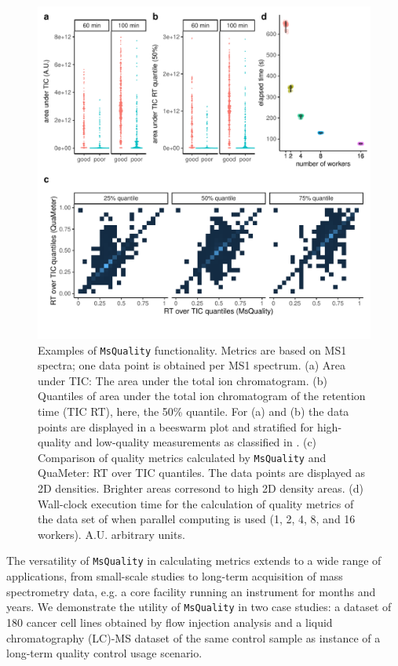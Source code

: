 \documentclass[unnumsec,webpdf,contemporary,large]{oup-authoring-template}%
\theoremstyle{thmstyleone}%
\theoremstyle{thmstyletwo}%
\theoremstyle{thmstylethree}%
\begin{document}
\begin{figure}
    \centering
 	\includegraphics[scale=0.421, clip, trim=0 37 0 5, scale = 0.9]{figure-main}
 	  \caption{Examples of \texttt{MsQuality} functionality. Metrics are based
 	        on MS1 spectra; one data point is obtained per MS1 spectrum.
 	        (a) Area under TIC: The area under the total ion chromatogram. 
            (b) Quantiles of area under the total ion
                chromatogram of the retention time (TIC RT), here, the 50\% quantile. 
  	      For (a) and (b) the data points are displayed 
                in a beeswarm plot and stratified for high-quality and low-quality
                measurements as classified in \cite{Amidan2014}.
            (c) Comparison of quality metrics calculated by \texttt{MsQuality} 
                and QuaMeter: RT over TIC quantiles. The
	      data points are displayed as 2D densities. Brighter areas corresond to
               high 2D density areas.
            (d) Wall-clock execution time for the calculation of quality metrics of the 
                data set of \cite{Amidan2014} when parallel computing is used 
                (1, 2, 4, 8, and 16 workers). A.U. arbitrary units.
    } \label{fig:fig1}
\end{figure}

The versatility of \texttt{MsQuality} in calculating metrics extends to a wide range of
applications, from small-scale studies to long-term acquisition of mass spectrometry
data, e.g. a core facility running an instrument for months and years. 
We demonstrate the utility of \texttt{MsQuality} in two case studies: a 
dataset of 180 cancer cell lines obtained by flow injection analysis
\citep{Cherkaoui2022} and a liquid chromatography (LC)-MS dataset of the same 
control sample \citep{Amidan2014} as instance of a long-term quality control 
usage scenario. 
\end{document}
